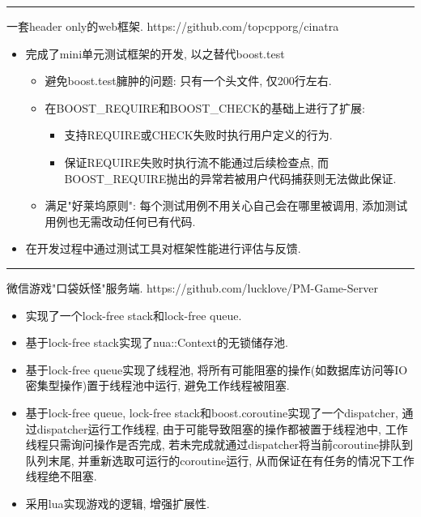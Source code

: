 \documentclass{resume}
\newcommand{\subsectionrule}{{\vspace{-8pt}\hspace{0.5cm}\rule[1pt]{\linewidth-1cm}{0.05pt}\vspace{-8pt}}}
\begin{document}
\subsectionrule

\begin{onehalfspacing}
一套header only的web框架. 
\newline
https://github.com/topcpporg/cinatra
\begin{itemize}
  \item 完成了mini单元测试框架的开发, 以之替代boost.test
  \begin{itemize}
    \item 避免boost.test臃肿的问题: 只有一个头文件, 仅200行左右.
    \item 在BOOST\_REQUIRE和BOOST\_CHECK的基础上进行了扩展:
    \begin{itemize}
        \item 支持REQUIRE或CHECK失败时执行用户定义的行为.
        \item 保证REQUIRE失败时执行流不能通过后续检查点, 而BOOST\_REQUIRE抛出的异常若被用户代码捕获则无法做此保证.
    \end{itemize}
    \item 满足"好莱坞原则": 每个测试用例不用关心自己会在哪里被调用, 添加测试用例也无需改动任何已有代码.
  \end{itemize}
  \item 在开发过程中通过测试工具对框架性能进行评估与反馈.
\end{itemize}
\end{onehalfspacing}

\subsectionrule

\begin{onehalfspacing}
微信游戏"口袋妖怪"服务端.
\newline
https://github.com/lucklove/PM-Game-Server
\begin{itemize}
  \item 实现了一个lock-free stack和lock-free queue.
  \item 基于lock-free stack实现了nua::Context的无锁储存池.
  \item 基于lock-free queue实现了线程池, 将所有可能阻塞的操作(如数据库访问等IO密集型操作)置于线程池中运行, 避免工作线程被阻塞.
  \item 基于lock-free queue, lock-free stack和boost.coroutine实现了一个dispatcher, 通过dispatcher运行工作线程, 由于可能导致阻塞的操作都被置于线程池中, 工作线程只需询问操作是否完成, 若未完成就通过dispatcher将当前coroutine排队到队列末尾, 并重新选取可运行的coroutine运行, 从而保证在有任务的情况下工作线程绝不阻塞.
  \item 采用lua实现游戏的逻辑, 增强扩展性.
\end{itemize}
\end{onehalfspacing}
\end{document}

